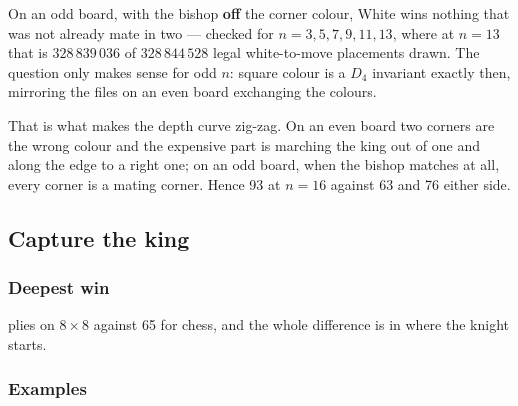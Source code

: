 \documentclass[10pt]{article}
\begin{document}
\medskip
\noindent
\begin{minipage}[t]{0.30\textwidth}
\end{minipage}\hfill
\begin{minipage}[t]{0.30\textwidth}
\end{minipage}\hfill
\begin{minipage}[t]{0.36\textwidth}\vspace{0pt}\small
On an odd board, with the bishop \textbf{off} the corner colour, White wins
nothing that was not already mate in two --- checked for $n=3,5,7,9,11,13$,
where at $n=13$ that is $328\,839\,036$ of $328\,844\,528$ legal white-to-move
placements drawn. The question only makes sense for odd $n$: square colour is a
$D_4$ invariant exactly then, mirroring the files on an even board exchanging
the colours.

\smallskip
That is what makes the depth curve zig-zag. On an even board two corners are
the wrong colour and the expensive part is marching the king out of one and
along the edge to a right one; on an odd board, when the bishop matches at all,
every corner is a mating corner. Hence 93 at $n=16$ against 63 and 76 either
side.
\end{minipage}

\subsection{Capture the king}\label{sub:kbnk-capture}

\subsubsection{Deepest win}\label{sub:kbnk-cap-law}

 plies on $8\times8$ against 65 for chess, and the whole difference is in
where the knight starts.

\subsubsection{Examples}\label{sub:kbnk-cap-pos}
\end{document}
